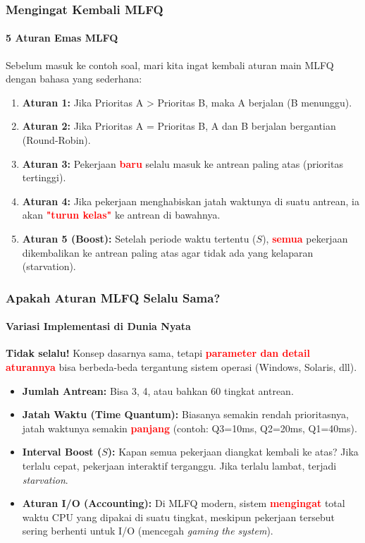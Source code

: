 \documentclass[t,aspectratio=169,xcolor=dvipsnames]{beamer}
\newcommand{\tem}[1]{\textbf{\textcolor{red}{#1}}}
\begin{document}
\begin{frame}
    \frametitle{Mengingat Kembali MLFQ}
    \framesubtitle{5 Aturan Emas MLFQ}
    \small
    Sebelum masuk ke contoh soal, mari kita ingat kembali aturan main MLFQ dengan bahasa yang sederhana:
    \vspace{0.3cm}
    \begin{enumerate}
        \item \textbf{Aturan 1:} Jika Prioritas A > Prioritas B, maka A berjalan (B menunggu).
        \item \textbf{Aturan 2:} Jika Prioritas A = Prioritas B, A dan B berjalan bergantian (Round-Robin).
        \item \textbf{Aturan 3:} Pekerjaan \tem{baru} selalu masuk ke antrean paling atas (prioritas tertinggi).
        \item \textbf{Aturan 4:} Jika pekerjaan menghabiskan jatah waktunya di suatu antrean, ia akan \tem{"turun kelas"} ke antrean di bawahnya.
        \item \textbf{Aturan 5 (Boost):} Setelah periode waktu tertentu ($S$), \tem{semua} pekerjaan dikembalikan ke antrean paling atas agar tidak ada yang kelaparan (starvation).
    \end{enumerate}
\end{frame}

\begin{frame}
    \frametitle{Apakah Aturan MLFQ Selalu Sama?}
    \framesubtitle{Variasi Implementasi di Dunia Nyata}
    \small
    \textbf{Tidak selalu!} Konsep dasarnya sama, tetapi \tem{parameter dan detail aturannya} bisa berbeda-beda tergantung sistem operasi (Windows, Solaris, dll).
    \vspace{0.3cm}
    \begin{itemize}
        \item \textbf{Jumlah Antrean:} Bisa 3, 4, atau bahkan 60 tingkat antrean.
        \item \textbf{Jatah Waktu (Time Quantum):} Biasanya semakin rendah prioritasnya, jatah waktunya semakin \tem{panjang} (contoh: Q3=10ms, Q2=20ms, Q1=40ms).
        \item \textbf{Interval Boost ($S$):} Kapan semua pekerjaan diangkat kembali ke atas? Jika terlalu cepat, pekerjaan interaktif terganggu. Jika terlalu lambat, terjadi \textit{starvation}.
        \item \textbf{Aturan I/O (Accounting):} Di MLFQ modern, sistem \tem{mengingat} total waktu CPU yang dipakai di suatu tingkat, meskipun pekerjaan tersebut sering berhenti untuk I/O (mencegah \textit{gaming the system}).
    \end{itemize}
\end{frame}
\end{document}

